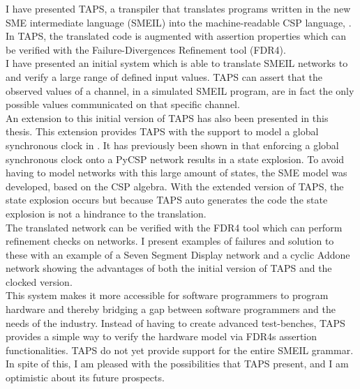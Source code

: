 I have presented TAPS, a transpiler that translates programs written in the
new SME intermediate language (SMEIL) into the machine-readable CSP language,
\cspm{}. In TAPS, the translated \cspm{} code is augmented with assertion
properties which can be verified with the Failure-Divergences Refinement tool
(FDR4).\\
I have presented an initial system which is able to translate SMEIL networks to
\cspm{} and verify a large range of defined input values. TAPS can assert that
the observed values of a channel, in a simulated SMEIL program, are in fact the
only possible values communicated on that specific channel. \\

An extension to this initial version of TAPS has also been presented in this
thesis. This extension provides TAPS with the support to model a global
synchronous clock in \cspm{}. It has previously been shown in \cite{Skaarup14}
that enforcing a global synchronous clock onto a PyCSP network results in a
state explosion. To avoid having to model networks with this large amount of
states, the SME model was developed, based on the CSP algebra. With the
extended version of TAPS, the state explosion occurs but because TAPS auto
generates the \cspm{} code the state explosion is not a hindrance to the
translation.\\

The translated \cspm{} network can be verified with the FDR4 tool which can
perform refinement checks on \cspm{} networks. I present examples of failures
and solution to these with an example of a Seven Segment Display network and a
cyclic Addone network showing the advantages of both the initial version of TAPS and the clocked version.\\

This system makes it more accessible for software programmers to program
hardware and thereby bridging a gap between software programmers and the needs
of the industry.
Instead of having to create advanced test-benches, TAPS provides a simple
way to verify the hardware model via FDR4s assertion functionalities.
TAPS do not yet provide support for the entire SMEIL grammar. In spite of this,
I am pleased with the possibilities that TAPS present, and I am optimistic about its future prospects.




